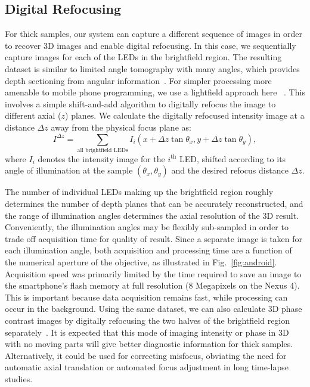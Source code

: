 \subsection{Digital Refocusing}
For thick samples, our system can capture a different sequence of images in order to recover 3D images and enable digital refocusing. In this case, we sequentially capture images for each of the LEDs in the brightfield region. The resulting dataset is similar to limited angle tomography with many angles, which provides depth sectioning from angular information~\cite{Kak:1988fk}. For simpler processing more amenable to mobile phone programming, we use a lightfield approach here ~\cite{Ng2005,Zheng2011}. This involves a simple shift-and-add algorithm to digitally refocus the image to different axial ($z$) planes. We calculate the digitally refocused intensity image at a distance $\Delta z$ away from the physical focus plane as:
\begin{equation}
I^{\Delta z} = \sum_{\text{all brightfield LEDs}}I_i(x+\Delta z\tan{\theta_x}, y+\Delta z\tan{\theta_y}),
\label{I_refocus}
\end{equation}
where $I_i$ denotes the intensity image for the $i^{\text{th}}$ LED, shifted according to its angle of illumination at the sample $(\theta_x,\theta_y)$ and the desired refocus distance $\Delta z$.

The number of individual LEDs making up the brightfield region roughly determines the number of depth planes that can be accurately reconstructed, and the range of illumination angles determines the axial resolution of the 3D result. Conveniently, the illumination angles may be flexibly sub-sampled in order to trade off acquisition time for quality of result. Since a separate image is taken for each illumination angle, both acquisition and processing time are a function of the numerical aperture of the objective, as illustrated in Fig.~\ref{fig:android}. Acquisition speed was primarily limited by the time required to save an image to the smartphone’s flash memory at full resolution (8 Megapixels on the Nexus 4). This is important because data acquisition remains fast, while processing can occur in the background. Using the same dataset, we can also calculate 3D phase contrast images by digitally refocusing the two halves of the brightfield region separately~\cite{Tian14}. It is expected that this mode of imaging intensity or phase in 3D with no moving parts will give better diagnostic information for thick samples. Alternatively, it could be used for correcting misfocus, obviating the need for automatic axial translation or automated focus adjustment in long time-lapse studies.

